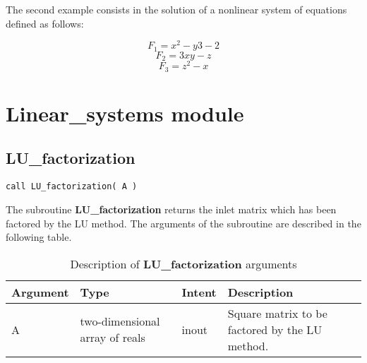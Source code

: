  The second example consists in the solution of a nonlinear system of equations defined as follows:
 
  \begin{equation*}
  F_{1}=x^{2}-y{3}-2
  \end{equation*}
  \begin{equation*}
  F_{2}=3xy-z
  \end{equation*}
 \begin{equation*}
 F_{3}=z^{2}-x
 \end{equation*}
 
 \newpage
 
\par\vspace{\baselineskip}
\lstset{language=Fortran}





\newpage


\section{Linear\_systems module}


\subsection*{LU\_factorization}

\lstset{language=Fortran}
\begin{lstlisting}[frame=trBL]
call LU_factorization( A )
\end{lstlisting}

The subroutine \textbf{LU\_factorization} returns the inlet matrix which has been factored by the LU method. The arguments of the subroutine are described in the following table.

\begin{table}[H]
	\begin{center}
	\begin{spacing}{1.2}
		\begin{tabular}{| l | l | l | p{5cm} |}
			
\hline
			
\bf Argument & \bf Type & \bf Intent & \bf Description \\ \hline \hline
			
A & two-dimensional array of reals & inout & Square matrix to be factored by the LU method.\\ \hline
			
		\end{tabular}
	\end{spacing}
	\end{center}
	\caption{Description of \textbf{LU\_factorization} arguments}
\end{table}

